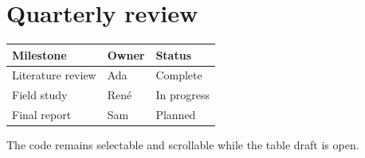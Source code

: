 \documentclass{article}
\begin{document}
\section*{Quarterly review}
\begin{tabular}{lll}
\toprule
Milestone & Owner & Status \\
\midrule
Literature review & Ada & Complete \\
Field study & René & In progress \\
Final report & Sam & Planned \\
\bottomrule
\end{tabular}

The code remains selectable and scrollable while the table draft is open.
\end{document}
